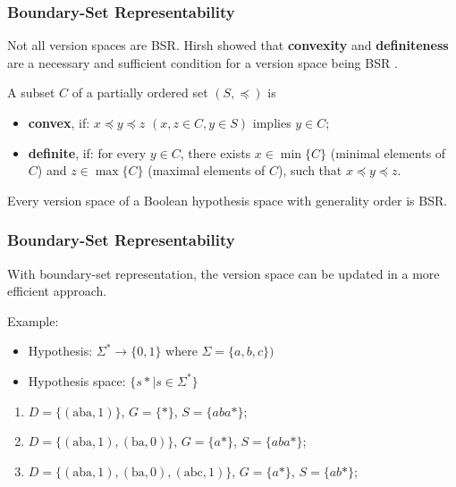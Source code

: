 \documentclass{beamer}
\begin{document}
\begin{frame}
\frametitle{Boundary-Set Representability}

Not all version spaces are BSR. Hirsh showed that \textbf{convexity} and \textbf{definiteness} are a necessary and sufficient condition for a version space being BSR \cite{hirsh}.
	
	A subset $C$ of a partially ordered set $(S, \preceq)$ is
	\begin{itemize}
		\item \textbf{convex}, if: $x \preceq y \preceq z$ $(x, z \in C, y \in S)$ implies $y \in C$;
		\item \textbf{definite}, if: for every $y \in C$, there exists $x \in \min\{C\}$ (minimal elements of $C$) and $z \in \max\{C\}$ (maximal elements of $C$), such that $x \preceq y \preceq z$.
	\end{itemize}

\pause

\begin{theorem}
	Every version space of a Boolean hypothesis space with generality order is BSR.
\end{theorem}
\end{frame}

\begin{frame}
\frametitle{Boundary-Set Representability}

With boundary-set representation, the version space can be updated in a more efficient approach.

\pause

Example:
\begin{itemize}
\item Hypothesis: $\Sigma^* \rightarrow \{0, 1\}$ where $\Sigma = \{a,b,c\})$
\item Hypothesis space: $\{ s* | s \in \Sigma^*\}$
\end{itemize}

\pause

\begin{enumerate}[<+->]
	\item $D = \{(\text{aba}, 1)\}$, $G = \{*\}$, $S = \{aba*\}$;
	\item $D = \{(\text{aba}, 1), (\text{ba}, 0)\}$, $G = \{a*\}$, $S = \{aba*\}$;
	\item $D = \{(\text{aba}, 1), (\text{ba}, 0), (\text{abc}, 1)\}$, $G = \{a*\}$, $S = \{ab*\}$;
\end{enumerate}

\end{frame}
\end{document}

